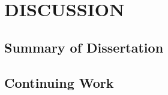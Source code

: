 \chapter{\uppercase{Discussion} \label{chapter:05}}

\section{Summary of Dissertation}
\lipsum

\section{Continuing Work}
\lipsum
